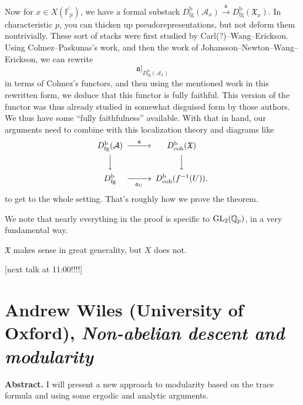 \documentclass[reqno]{amsart} 
\begin{document}
Now for $x \in X(\overline{\mathbb{F}_p})$, we have a formal substack $D_{\mathrm{fg}}^{\mathrm{b}}(\mathcal{A}_x) \xrightarrow{\mathfrak{a}} D_{\mathrm{fg}}^{\mathrm{b}}(\mathfrak{X}_x )$.  In characteristic $p$, you can thicken up pseudorepresentations, but not deform them nontrivially.  These sort of stacks were first studied by Carl(?)--Wang--Erickson.  Using Colmez--Paskunas's work, and then the work of Johansson--Newton--Wang--Erickson, we can rewrite
\begin{equation*}
  \mathfrak{a} |_{D_{\mathrm{fg}}^{\mathrm{b}}(\mathcal{A}_x)}
\end{equation*}
in terms of Colmez's functors, and then using the mentioned work in this rewritten form, we deduce that this functor is fully faithful.  This version of the functor was thus already studied in somewhat disguised form by those authors.  We thus have some ``fully faithfulness'' available.  With that in hand, our arguments need to combine with this localization theory and diagrams like
\begin{equation*}
  \begin{CD}         
    D^{\mathrm{b}}_{\mathrm{fg}}(\mathcal{A})    @> \mathfrak{a}>> D_{\mathrm{coh}}^{\mathrm{b}}(\mathfrak{X})\\
    @VVV  @VVV \\
    D_{\mathrm{fg}}^{\mathrm{b}} @>> \mathfrak{a}_U> D_{\mathrm{coh}}^{\mathrm{b}}(f^{-1}(U)).\\
  \end{CD}
\end{equation*}
to get to the whole setting.  That's roughly how we prove the theorem.

We note that nearly everything in the proof is specific to $\operatorname{GL}_2(\mathbb{Q}_p)$, in a very fundamental way.

\begin{remark}
  $\mathfrak{X}$ makes sense in great generality, but $X$ does not.
\end{remark}

[next talk at 11:00!!!!]

\part{Andrew Wiles (University of Oxford), \emph{Non-abelian descent and modularity}}

\textbf{Abstract.}  I will present a new approach to modularity based on the trace formula and using some ergodic
and analytic arguments.
\end{document}
